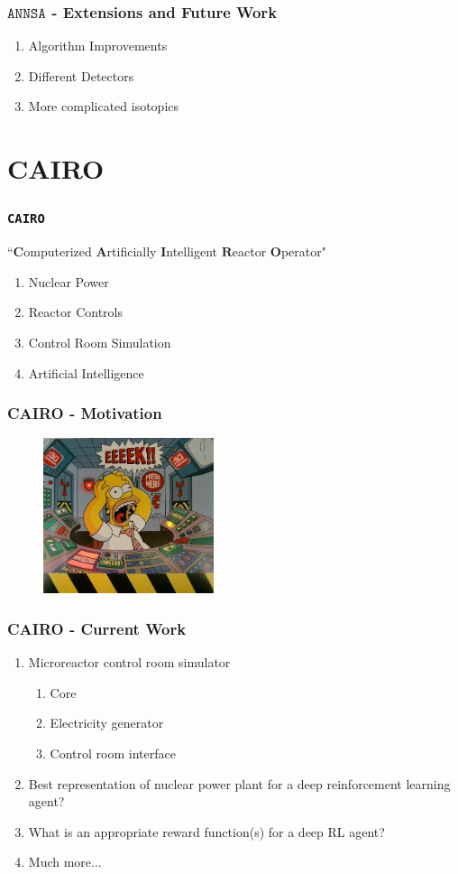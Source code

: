 \documentclass{beamer}
\begin{document}
	\begin{frame}
		\frametitle{$\texttt{ANNSA}$ - Extensions and Future Work}
		\begin{enumerate}
			\item Algorithm Improvements
			\item Different Detectors
			\item More complicated isotopics
		\end{enumerate}
	\end{frame}

	\section{CAIRO}

	\begin{frame}
		\frametitle{\texttt{CAIRO}}
		``$\textbf{C}$omputerized $\textbf{A}$rtificially $\textbf{I}$ntelligent $\textbf{R}$eactor $\textbf{O}$perator"\\
		\begin{enumerate}
			\item Nuclear Power
			\item Reactor Controls
			\item Control Room Simulation
			\item Artificial Intelligence
		\end{enumerate}
	\end{frame}

	\begin{frame}
		\frametitle{CAIRO - Motivation}
		\begin{figure}
			\includegraphics[width=5cm]{homer-reactor.jpg}
		\end{figure}
	\end{frame}
	\begin{frame}
		\frametitle{CAIRO - Current Work}
		\begin{enumerate}
			\item Microreactor control room simulator
			\begin{enumerate}
				\item Core
				\item Electricity generator
				\item Control room interface
			\end{enumerate}
			\item Best representation of nuclear power plant for a deep reinforcement learning agent?
			\item What is an appropriate reward function(s) for a deep RL agent?
			\item Much more... 
		\end{enumerate}
	\end{frame}
\end{document}
